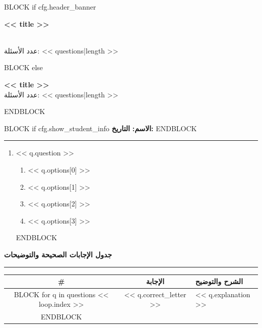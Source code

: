 \documentclass[11pt, a4paper]{article}
\begin{document}
BLOCK if cfg.header_banner
\begin{center}
    \colorbox{accentcolor}{\parbox{\linewidth}{\centering \color{white} \Large \textbf{<< title >>}}} \\[0.2cm]
    \small \textcolor{accentcolor}{عدد الأسئلة: << questions|length >>}
\end{center}
BLOCK else
\begin{center}
    {\Large \textcolor{accentcolor}{\textbf{<< title >>}}} \\[0.2cm]
    \small عدد الأسئلة: << questions|length >>
\end{center}
ENDBLOCK

BLOCK if cfg.show_student_info
\vspace{0.2cm}
\noindent \textbf{الاسم:} \underline{\hspace{6cm}} \hfill \textbf{التاريخ:} \underline{\hspace{3cm}}
\vspace{0.2cm}
ENDBLOCK

\rule{\linewidth}{1pt}
\vspace{0.3cm}

\begin{enumerate}
BLOCK for q in questions
    \item << q.question >>
    \begin{enumerate}
        \item << q.options[0] >>
        \item << q.options[1] >>
        \item << q.options[2] >>
        \item << q.options[3] >>
    \end{enumerate}
    \vspace{0.25cm}
ENDBLOCK
\end{enumerate}

\newpage

\begin{center}
    {\Large \textcolor{accentcolor}{\textbf{جدول الإجابات الصحيحة والتوضيحات}}}
\end{center}
\rule{\linewidth}{1pt}
\vspace{0.3cm}

\noindent
\begin{tabularx}{\linewidth}{|c|c|X|}
\hline
\textbf{\#} & \textbf{الإجابة} & \textbf{الشرح والتوضيح} \\ \hline
BLOCK for q in questions
<< loop.index >> & << q.correct_letter >> & << q.explanation >> \\ \hline
ENDBLOCK
\end{tabularx}
\end{document}
